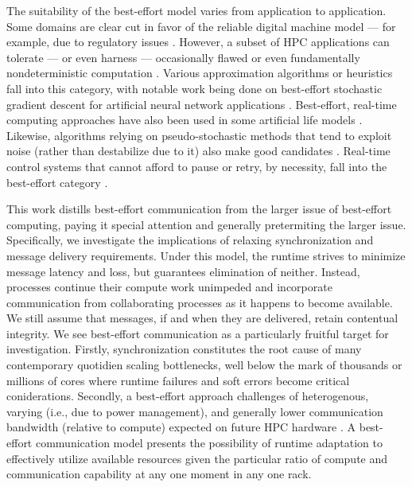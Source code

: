 The suitability of the best-effort model varies from application to application.
Some domains are clear cut in favor of the reliable digital machine model --- for example, due to regulatory issues \citep{dengorra2014applied}.
However, a subset of HPC applications can tolerate --- or even harness --- occasionally flawed or even fundamentally nondeterministic computation \citep{chakradhar2010best}.
Various approximation algorithms or heuristics fall into this category, with notable work being done on best-effort stochastic gradient descent for artificial neural network applications \citep{dean2012large,zhao2019elastic,niu2011hogwild,noel2014dogwild}.
Best-effort, real-time computing approaches have also been used in some artificial life models \citep{ray1995proposal}.
Likewise, algorithms relying on pseudo-stochastic methods that tend to exploit noise (rather than destabilize due to it) also make good candidates \citep{chakrapani2008probabilistic,chakradhar2010best}.
Real-time control systems that cannot afford to pause or retry, by necessity, fall into the best-effort category \citep{rahmati2011computing}.

This work distills best-effort communication from the larger issue of best-effort computing, paying it special attention and generally pretermiting the larger issue.
Specifically, we investigate the implications of relaxing synchronization and message delivery requirements.
Under this model, the runtime strives to minimize message latency and loss, but guarantees elimination of neither.
Instead, processes continue their compute work unimpeded and incorporate communication from collaborating processes as it happens to become available.
We still assume that messages, if and when they are delivered, retain contentual integrity.
We see best-effort communication as a particularly fruitful target for investigation.
Firstly, synchronization constitutes the root cause of many contemporary quotidien scaling bottlenecks, well below the mark of thousands or millions of cores where runtime failures and soft errors become critical coniderations.
Secondly, a best-effort approach  challenges of heterogenous, varying (i.e., due to power management), and generally lower communication bandwidth (relative to compute) expected on future HPC hardware \citep{gropp2013programming, acun2014parallel}.
A best-effort communication model presents the possibility of runtime adaptation to effectively utilize available resources given the particular ratio of compute and communication capability at any one moment in any one rack.

